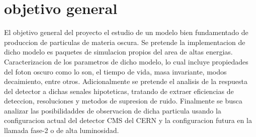 \chapter{objetivo general}

El objetivo general del proyecto el estudio de un modelo bien fundamentado de produccion de particulas de materia oscura. Se pretende la implementacion de dicho modelo es paquetes de simulacion propios del area de altas energias.  Caracterizacion de los parametros de dicho modelo, lo cual incluye propiedades del foton oscuro como lo son, el tiempo de vida, masa invariante, modos decaimiento, entre otros.  Adicionalmente se pretende el analisis de la respuesta del detector a dichas senales hipoteticas, tratando de extraer eficiencias de deteccion, resoluciones y metodos de supresion de ruido.  Finalmente se busca analizar las posibilidaddes de observacion de dicha particula usando la configuracion actual del detector CMS del CERN y la configuracion futura en la llamada fase-2 o de alta luminosidad. 



